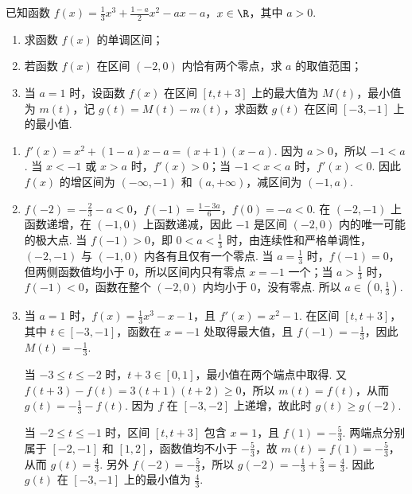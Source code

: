 \begin{problem}
已知函数 \(f(x) = \frac{1}{3} x^3 + \frac{1 - a}{2} x^2 - ax - a\)，\(x \in \R\)，其中 \( a > 0 \).
\begin{enumerate}
\item 求函数 \( f(x) \) 的单调区间；
\item 若函数 \( f(x) \) 在区间 \((-2,0)\) 内恰有两个零点，求 \( a \) 的取值范围；
\item 当 \(a = 1\) 时，设函数 \(f(x)\) 在区间 \([t, t + 3]\) 上的最大值为 \(M(t)\)，最小值为 \(m(t)\)，记 \(g(t) = M(t) - m(t)\)，求函数 \(g(t)\) 在区间 \([-3, -1]\) 上的最小值.
\end{enumerate}
\end{problem}

\begin{solution}
\begin{enumerate}
\item \(f'(x)=x^2+(1-a)x-a=(x+1)(x-a)\). 因为 \(a>0\)，所以 \(-1<a\). 当 \(x<-1\) 或 \(x>a\) 时，\(f'(x)>0\)；当 \(-1<x<a\) 时，\(f'(x)<0\). 因此 \(f(x)\) 的增区间为 \((-\infty,-1)\) 和 \((a,+\infty)\)，减区间为 \((-1,a)\).
\item \(f(-2)=-\frac23-a<0\)，\(f(-1)=\frac{1-3a}{6}\)，\(f(0)=-a<0\). 在 \((-2,-1)\) 上函数递增，在 \((-1,0)\) 上函数递减，因此 \(-1\) 是区间 \((-2,0)\) 内的唯一可能的极大点. 当 \(f(-1)>0\)，即 \(0<a<\frac13\) 时，由连续性和严格单调性，\((-2,-1)\) 与 \((-1,0)\) 内各有且仅有一个零点. 当 \(a=\frac13\) 时，\(f(-1)=0\)，但两侧函数值均小于 \(0\)，所以区间内只有零点 \(x=-1\) 一个；当 \(a>\frac13\) 时，\(f(-1)<0\)，函数在整个 \((-2,0)\) 内均小于 \(0\)，没有零点. 所以 \(a\in\left(0,\frac13\right)\).
\item 当 \(a=1\) 时，\(f(x)=\frac13x^3-x-1\)，且 \(f'(x)=x^2-1\). 在区间 \([t,t+3]\)，其中 \(t\in[-3,-1]\)，函数在 \(x=-1\) 处取得最大值，且 \(f(-1)=-\frac13\)，因此 \(M(t)=-\frac13\).

当 \(-3\leqslant t\leqslant-2\) 时，\(t+3\in[0,1]\)，最小值在两个端点中取得. 又 \(f(t+3)-f(t)=3(t+1)(t+2)\geqslant0\)，所以 \(m(t)=f(t)\)，从而 \(g(t)=-\frac13-f(t)\). 因为 \(f\) 在 \([-3,-2]\) 上递增，故此时 \(g(t)\geqslant g(-2)\).

当 \(-2\leqslant t\leqslant-1\) 时，区间 \([t,t+3]\) 包含 \(x=1\)，且 \(f(1)=-\frac53\). 两端点分别属于 \([-2,-1]\) 和 \([1,2]\)，函数值均不小于 \(-\frac53\)，故 \(m(t)=f(1)=-\frac53\)，从而 \(g(t)=\frac43\). 另外 \(f(-2)=-\frac53\)，所以 \(g(-2)=-\frac13+\frac53=\frac43\). 因此 \(g(t)\) 在 \([-3,-1]\) 上的最小值为 \(\frac43\).
\end{enumerate}
\end{solution}

